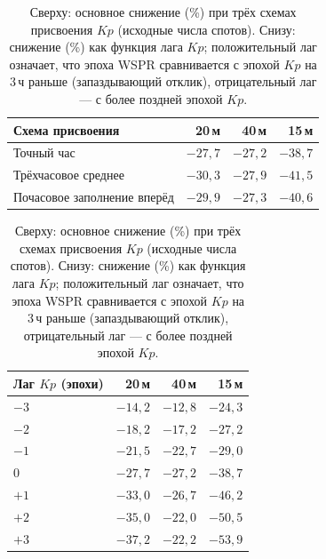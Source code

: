 \documentclass{agujournal2019}
\begin{document}
\begin{table}[h]
	\centering
	\small
	\caption{Сверху: основное снижение (\%) при трёх схемах присвоения $Kp$ (исходные числа спотов).
		Снизу: снижение (\%) как функция лага $Kp$; положительный лаг
		означает, что эпоха WSPR сравнивается с эпохой $Kp$ на 3\,ч раньше
		(запаздывающий отклик), отрицательный лаг — с более поздней эпохой
		$Kp$.}
	\label{tab:merge}
	\begin{tabular}{lrrr}
		\toprule
		Схема присвоения & 20\,м & 40\,м & 15\,м \\
		\midrule
		Точный час              & $-27{,}7$ & $-27{,}2$ & $-38{,}7$ \\
		Трёхчасовое среднее                & $-30{,}3$ & $-27{,}9$ & $-41{,}5$ \\
		Почасовое заполнение вперёд   & $-29{,}9$ & $-27{,}3$ & $-40{,}6$ \\
		\bottomrule
	\end{tabular}

	\vspace{1.2ex}
	\begin{tabular}{lrrr}
		\toprule
		Лаг $Kp$ (эпохи) & 20\,м & 40\,м & 15\,м \\
		\midrule
		$-3$ & $-14{,}2$ & $-12{,}8$ & $-24{,}3$ \\
		$-2$ & $-18{,}2$ & $-17{,}2$ & $-27{,}2$ \\
		$-1$ & $-21{,}5$ & $-22{,}7$ & $-29{,}0$ \\
		$0$  & $-27{,}7$ & $-27{,}2$ & $-38{,}7$ \\
		$+1$ & $-33{,}0$ & $-26{,}7$ & $-46{,}2$ \\
		$+2$ & $-35{,}0$ & $-22{,}0$ & $-50{,}5$ \\
		$+3$ & $-37{,}2$ & $-22{,}2$ & $-53{,}9$ \\
		\bottomrule
	\end{tabular}
\end{table}
\end{document}
